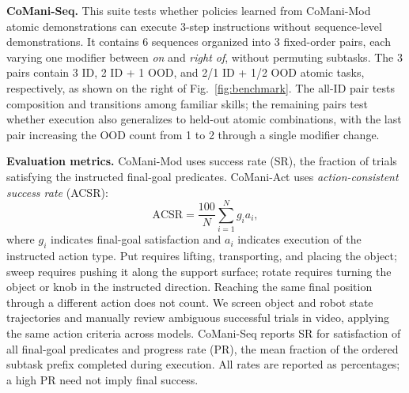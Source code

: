 
\textbf{CoMani-Seq.} This suite tests whether policies learned from CoMani-Mod atomic demonstrations can execute 3-step instructions without sequence-level demonstrations.
It contains 6 sequences organized into 3 fixed-order pairs, each varying one modifier between \emph{on} and \emph{right of}, without permuting subtasks.
The 3 pairs contain 3 ID, 2 ID + 1 OOD, and 2/1 ID + 1/2 OOD atomic tasks, respectively, as shown on the right of Fig.~\ref{fig:benchmark}.
The all-ID pair tests composition and transitions among familiar skills; the remaining pairs test whether execution also generalizes to held-out atomic combinations, with the last pair increasing the OOD count from 1 to 2 through a single modifier change.


\textbf{Evaluation metrics.}
CoMani-Mod uses success rate (SR), the fraction of trials satisfying the instructed final-goal predicates.
CoMani-Act uses \emph{action-consistent success rate} (ACSR):
\begin{equation}
\mathrm{ACSR}=\frac{100}{N}\sum_{i=1}^{N}g_i a_i,
\end{equation}
where $g_i$ indicates final-goal satisfaction and $a_i$ indicates execution of the instructed action type.
Put requires lifting, transporting, and placing the object; sweep requires pushing it along the support surface; rotate requires turning the object or knob in the instructed direction.
Reaching the same final position through a different action does not count.
We screen object and robot state trajectories and manually review ambiguous successful trials in video, applying the same action criteria across models.
CoMani-Seq reports SR for satisfaction of all final-goal predicates and progress rate (PR), the mean fraction of the ordered subtask prefix completed during execution.
All rates are reported as percentages; a high PR need not imply final success.
